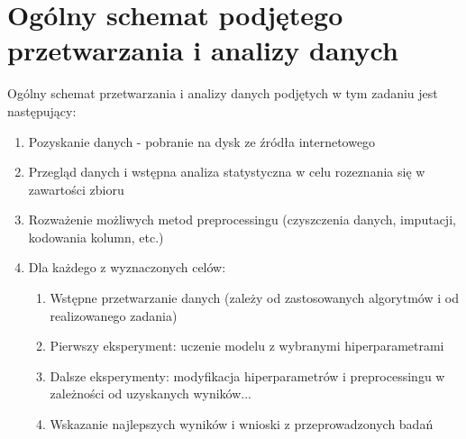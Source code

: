 \documentclass{classrep}
\begin{document}
    \section{Ogólny schemat podjętego przetwarzania i analizy danych} {
        Ogólny schemat przetwarzania i analizy danych podjętych w tym zadaniu jest następujący:
        \begin{enumerate}
            \item Pozyskanie danych - pobranie na dysk ze źródła internetowego
            \item Przegląd danych i wstępna analiza statystyczna w celu rozeznania się w zawartości zbioru
            \item Rozważenie możliwych metod preprocessingu (czyszczenia danych, imputacji, kodowania kolumn, etc.)
            \item Dla każdego z wyznaczonych celów:
                \begin{enumerate}
                    \item Wstępne przetwarzanie danych (zależy od zastosowanych algorytmów i od realizowanego zadania)
                    \item Pierwszy eksperyment: uczenie modelu z wybranymi hiperparametrami
                    \item Dalsze eksperymenty: modyfikacja hiperparametrów i preprocessingu w zależności od uzyskanych wyników...
                    \item Wskazanie najlepszych wyników i wnioski z przeprowadzonych badań
                \end{enumerate}
        \end{enumerate}
    }
    \newpage
\end{document}

